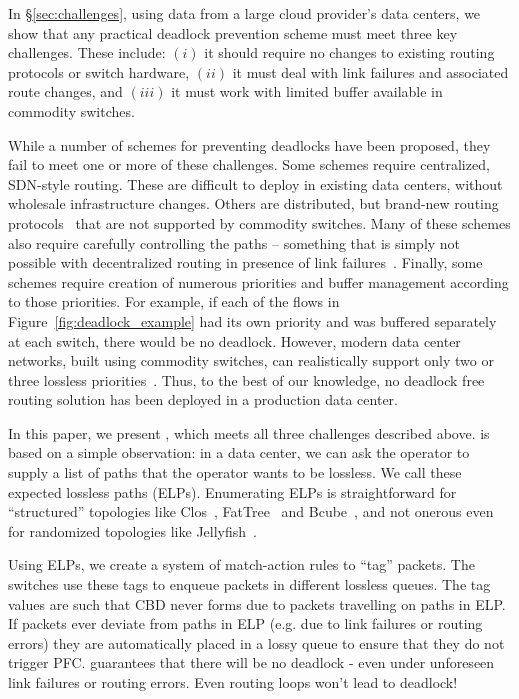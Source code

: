 In \S\ref{sec:challenges}, using data from a large cloud provider's data
centers, we show that any practical deadlock prevention scheme must meet three
key challenges. These include: $(i)$ it should require no changes to existing
routing protocols or switch hardware, $(ii)$ it must deal with link failures and
associated  route changes, and $(iii)$ it must work with limited buffer
available in commodity switches.

While a number of schemes for preventing deadlocks have been proposed, they fail
to meet one or more of these challenges.  Some schemes require centralized,
SDN-style routing.  These are difficult to deploy in existing data centers,
without wholesale infrastructure changes.  Others are distributed, but brand-new
routing protocols~\cite{tcpbolt} that are not supported by commodity switches.
Many of these schemes also require carefully controlling the paths -- something
that is simply not possible with decentralized routing in presence of link
failures~\cite{netpilot}.  Finally, some schemes require creation of numerous
priorities and buffer management according to those priorities. For example, if
each of the flows in Figure~\ref{fig:deadlock_example} had its own priority and
was buffered separately at each switch, there would be no deadlock.  However,
modern data center networks, built using commodity switches, can realistically
support only two or three lossless priorities~\cite{rdmaatscale}.  Thus, to the
best of our knowledge, no deadlock free routing solution has been deployed in a
production data center.  

In this paper, we present \sysname{}, which meets all three challenges described
above. \sysname{} is based on a simple observation: in a data center, we can ask
the operator to supply a list of paths that the operator wants to be lossless.
We call these expected lossless paths (ELPs). Enumerating ELPs is
straightforward for ``structured'' topologies like Clos~\cite{clos},
FatTree~\cite{fattree} and Bcube~\cite{bcube}, and not onerous even for
randomized topologies like Jellyfish~\cite{jellyfish}. 

Using ELPs, we create a system of match-action rules to ``tag'' packets. The
switches use these tags to enqueue packets in different lossless queues. The tag
values are such that CBD never forms due to packets travelling on paths in ELP.
If packets ever deviate from paths in ELP (e.g. due to link failures or routing
errors) they are automatically placed in a lossy queue to ensure that they do
not trigger PFC. \sysname{} guarantees that there will be no deadlock - even under
unforeseen link failures or routing errors. Even routing loops won't lead to
deadlock!

